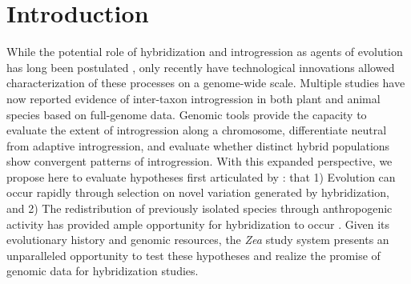 
\begin{center}
\end{center}
%
%

\section*{Introduction}
While the potential role of hybridization and introgression as agents of evolution has long been postulated \citep{Anderson1948, Anderson1954, Stebbins1959}, only recently have technological innovations allowed characterization of these processes on a genome-wide scale.
Multiple studies have now reported evidence of inter-taxon introgression in both plant \citep{Hufford2013, renaut2013} and animal \citep{consortiumbutterfly2012, staubach2012, huerta2014} species based on full-genome data.
Genomic tools provide the capacity to evaluate the extent of introgression along a chromosome, differentiate neutral from adaptive introgression, and evaluate whether distinct hybrid populations show convergent patterns of introgression.
With this expanded perspective, we propose here to evaluate hypotheses first articulated by \citet{Anderson1954}: that 1) Evolution can occur rapidly through selection on novel variation generated by hybridization, and 2) The redistribution of previously isolated species through anthropogenic activity has provided ample opportunity for hybridization to occur \citep{Anderson1954}.
Given its evolutionary history and genomic resources, the \emph{Zea} study system presents an unparalleled opportunity to test these hypotheses and realize the promise of genomic data for hybridization studies.

